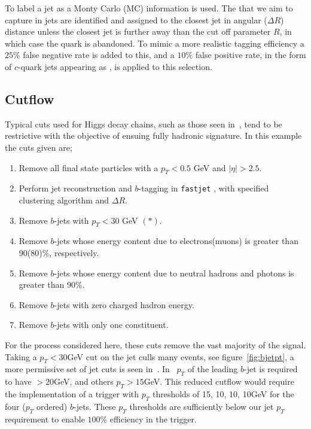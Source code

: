 To label a jet as a  Monty Carlo (MC) information is used.
The  that we aim to capture in jets are identified and
assigned to the closest jet in angular (\(\Delta R\)) distance
unless the closest jet is further away than the cut off parameter \(R\),
in which case the quark is abandoned.
To mimic a more realistic tagging efficiency a
\(25\%\) false negative rate is added to this,
and a \(10\%\) false positive rate, in the form of \(c\)-quark
jets appearing as , is applied to this selection.

\subsection{Cutflow}\label{sec:cutflow}

Typical cuts used for Higgs decay chains,
such as those seen in~\cite{Sirunyan2018alljet},
tend to be restrictive with the objective of 
ensuing fully hadronic signature. 
In this example the cuts given are;
\begin{enumerate}
    \item Remove all final state particles with a $p_T < 0.5$ GeV and $|\eta| > 2.5$.
    \item Perform jet reconstruction and $b$-tagging in {\tt fastjet} \cite{Cacciari2011FastJet}, with specified clustering algorithm and $\Delta R$.
    \item Remove $b$-jets with $p_T < 30$ GeV $(*)$.
    \item Remove $b$-jets whose energy content due to electrons(muons) is greater than  90(80)\%, respectively.
    \item Remove $b$-jets whose energy content due to neutral hadrons and photons is greater than 90\%.
    \item Remove $b$-jets with zero charged hadron energy.
    \item Remove $b$-jets with only one constituent.
\end{enumerate}

For the process considered here, 
these cuts remove the vast majority of the signal.
Taking a \(p_T < 30\)GeV cut on the jet culls many events,
see figure~\ref{fig:bjetpt},
a more permissive set of jet cuts is seen in~\cite{Sirunyan2019exotic}.
In~\cite{Sirunyan2019exotic} $p_T$ of the leading $b$-jet is required to have $>20$GeV, and others $p_T > 15$GeV. 
 This reduced cutflow would require the implementation of a trigger with $p_T$ thresholds of 15, 10, 10, 10GeV for the four ($p_T$ ordered) $b$-jets.
 These $p_T$ thresholds are sufficiently below our jet $p_T$ requirement to enable $100\%$ efficiency in the trigger. 

